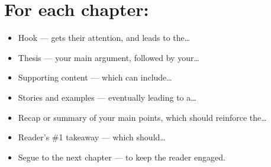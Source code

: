 \section*{For each chapter:}
\begin{itemize}
	\item Hook — gets their attention, and leads to the…
	\item Thesis — your main argument, followed by your…
	\item Supporting content — which can include…
	\item Stories and examples — eventually leading to a…
	\item Recap or summary of your main points, which should reinforce the…
	\item Reader’s \#1 takeaway — which should…
	\item Segue to the next chapter — to keep the reader engaged.
\end{itemize}



